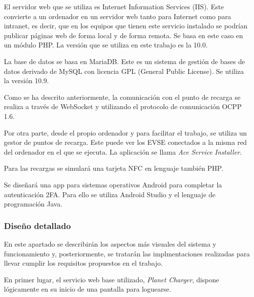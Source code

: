 \documentclass[12pt,a4paper,onecolumn,oneside]{report}
\begin{document}
El servidor web que se utiliza es Internet Information Services (IIS). Este convierte a un ordenador en un servidor web tanto para Internet como para intranet, es decir, que en los equipos que tienen este servicio instalado se podrían publicar páginas web de forma local y de forma remota. Se basa en este caso en un módulo PHP. La versión que se utiliza en este trabajo es la 10.0.

La base de datos se basa en MariaDB. Este es un sistema de gestión de bases de datos derivado de MySQL con licencia GPL (General Public License). Se utiliza la versión 10.9.

Como se ha descrito anteriormente, la comunicación con el punto de recarga se realiza a través de WebSocket y utilizando el protocolo de comunicación OCPP 1.6.

Por otra parte, desde el propio ordenador y para facilitar el trabajo, se utiliza un gestor de puntos de recarga. Este puede ver los EVSE conectados a la misma red del ordenador en el que se ejecuta. La aplicación se llama \textit{Ace Service Installer}.

Para las recargas se simulará una tarjeta NFC en lenguaje también PHP. 

Se diseñará una app para sistemas operativos Android para completar la autenticación 2FA. Para ello se utiliza Android Studio y el lenguaje de programación Java.


\subsubsection{Diseño detallado}

En este apartado se describirán los aspectos más visuales del sistema y funcionamiento y, posteriormente, se tratarán las implmentaciones realizadas para llevar cumplir los requisitos propuestos en el trabajo.

En primer lugar, el servicio web base utilizado, \textit{Planet Charger}, dispone lógicamente en su inicio de una pantalla para loguearse.
\end{document}
